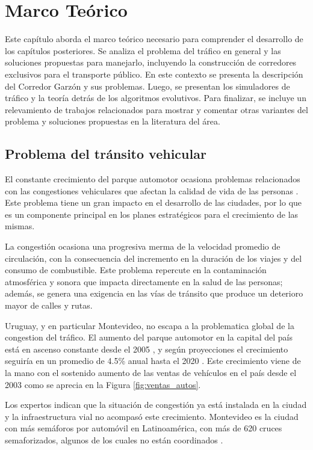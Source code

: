 \chapter{Marco Teórico}
Este capítulo aborda el marco teórico necesario para comprender el desarrollo de los capítulos posteriores. Se analiza el problema del tráfico en general y las soluciones propuestas para manejarlo, incluyendo la construcción de corredores exclusivos para el transporte público. En este contexto se presenta la descripción del Corredor Garzón y sus problemas. Luego, se presentan los simuladores de tráfico y la teoría detrás de los algoritmos evolutivos. Para finalizar, se incluye un relevamiento de trabajos relacionados para mostrar y comentar otras variantes del problema y soluciones propuestas en la literatura del área.
\section{Problema del tránsito vehicular}

El constante crecimiento del parque automotor ocasiona problemas relacionados con las congestiones vehiculares que afectan la calidad de vida de las personas \citep{Cepal2003}. Este problema tiene un gran impacto en el desarrollo de las ciudades, por lo que es un componente principal en los planes estratégicos para el crecimiento de las mismas.

La congestión ocasiona una progresiva merma de la velocidad promedio de circulación, con la consecuencia del incremento en la duración de los viajes y del consumo de combustible. Este problema repercute en la contaminación atmosférica y sonora que impacta directamente en la salud de las personas; además, se genera una exigencia en las vías de tránsito que produce un deterioro mayor de calles y rutas.

Uruguay, y en particular Montevideo, no escapa a la problematica global de la congestion del tráfico. El aumento del parque automotor en la capital del país está en ascenso constante desde el 2005 \citep{INE2014}, y según proyecciones el crecimiento seguiría en un promedio de 4.5\% anual hasta el 2020 \citep{BBVA2013}. Este crecimiento viene de la mano con el sostenido aumento de las ventas de vehículos en el país desde el 2003 como se aprecia en la Figura \ref{fig:ventas_autos}.

Los expertos indican que la situación de congestión ya está instalada en la ciudad y la infraestructura vial no acompasó este crecimiento. Montevideo es la ciudad con más semáforos por automóvil en Latinoamérica, con más de 620 cruces semaforizados, algunos de los cuales no están coordinados \citep{Subrayado2013}.

